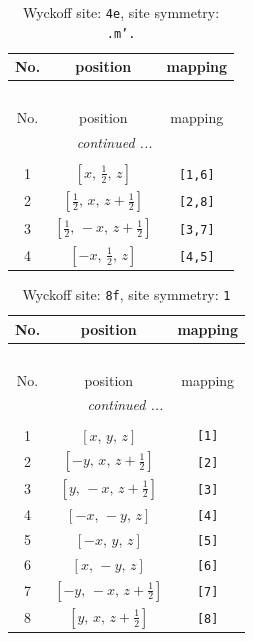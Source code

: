 \documentclass[fleqn,8pt]{jsarticle}
\begin{document}
\begin{longtable}{ccc}
\caption{Wyckoff site: {\tt 4e}, site symmetry: {\tt .m'.}}
 \\
 \hline \hline
No. & position & mapping \\ \hline \endfirsthead

\multicolumn{2}{l}{\tablename\ \thetable{}} \\
 \hline \hline
No. & position & mapping \\ \hline \endhead

 \hline \hline
\multicolumn{2}{r}{\footnotesize\it continued ...} \\ \endfoot

 \hline \hline
\multicolumn{2}{r}{} \\ \endlastfoot

1 & $\left[ x,\, \frac{1}{2},\, z \right]$ & {\tt [1,6]} \\ \hline
2 & $\left[ \frac{1}{2},\, x,\, z + \frac{1}{2} \right]$ & {\tt [2,8]} \\ \hline
3 & $\left[ \frac{1}{2},\, - x,\, z + \frac{1}{2} \right]$ & {\tt [3,7]} \\ \hline
4 & $\left[ - x,\, \frac{1}{2},\, z \right]$ & {\tt [4,5]} \\
\end{longtable}
\renewcommand{\arraystretch}{1.2}
\begin{longtable}{ccc}
\caption{Wyckoff site: {\tt 8f}, site symmetry: {\tt 1}}
 \\
 \hline \hline
No. & position & mapping \\ \hline \endfirsthead

\multicolumn{2}{l}{\tablename\ \thetable{}} \\
 \hline \hline
No. & position & mapping \\ \hline \endhead

 \hline \hline
\multicolumn{2}{r}{\footnotesize\it continued ...} \\ \endfoot

 \hline \hline
\multicolumn{2}{r}{} \\ \endlastfoot

1 & $\left[ x,\, y,\, z \right]$ & {\tt [1]} \\ \hline
2 & $\left[ - y,\, x,\, z + \frac{1}{2} \right]$ & {\tt [2]} \\ \hline
3 & $\left[ y,\, - x,\, z + \frac{1}{2} \right]$ & {\tt [3]} \\ \hline
4 & $\left[ - x,\, - y,\, z \right]$ & {\tt [4]} \\ \hline
5 & $\left[ - x,\, y,\, z \right]$ & {\tt [5]} \\ \hline
6 & $\left[ x,\, - y,\, z \right]$ & {\tt [6]} \\ \hline
7 & $\left[ - y,\, - x,\, z + \frac{1}{2} \right]$ & {\tt [7]} \\ \hline
8 & $\left[ y,\, x,\, z + \frac{1}{2} \right]$ & {\tt [8]} \\
\end{longtable}
\end{document}
